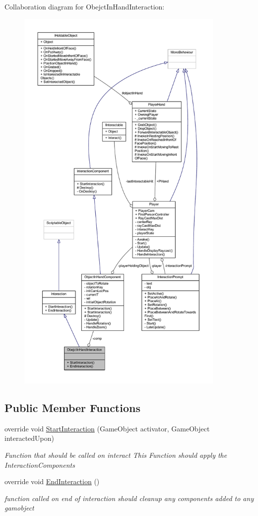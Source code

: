 Collaboration diagram for Obejct\+In\+Hand\+Interaction\+:
\nopagebreak
\begin{figure}[H]
\begin{center}
\leavevmode
\includegraphics[height=550pt]{class_obejct_in_hand_interaction__coll__graph}
\end{center}
\end{figure}
\subsection*{Public Member Functions}
\begin{DoxyCompactItemize}
\item 
override void \mbox{\hyperlink{class_obejct_in_hand_interaction_a9046df053628946f7ce5f4e484097482}{Start\+Interaction}} (Game\+Object activator, Game\+Object interacted\+Upon)
\begin{DoxyCompactList}\small\item\em Function that should be called on interact This Function should apply the Interaction\+Components \end{DoxyCompactList}\item 
override void \mbox{\hyperlink{class_obejct_in_hand_interaction_a67633fc3c21606d209e8e54db5c516a9}{End\+Interaction}} ()
\begin{DoxyCompactList}\small\item\em function called on end of interaction should cleanup any components added to any gamobject \end{DoxyCompactList}\end{DoxyCompactItemize}
